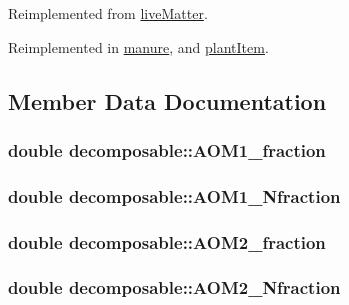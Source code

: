 Reimplemented from \hyperlink{classlive_matter_a694b548b571c88f71f2c7cc75b47d0fb}{liveMatter}.

Reimplemented in \hyperlink{classmanure_a88bca29dfcbb79bbe0a8a0ea33186fcc}{manure}, and \hyperlink{classplant_item_a57bdf6a52f37049686a779f3c93ecc73}{plantItem}.

\subsection{Member Data Documentation}
\hypertarget{classdecomposable_a273056446ce0c9b4d36d75f5d2cfd511}{
\subsubsection[{AOM1\_\-fraction}]{\setlength{\rightskip}{0pt plus 5cm}double {\bf decomposable::AOM1\_\-fraction}}}
\label{classdecomposable_a273056446ce0c9b4d36d75f5d2cfd511}
\hypertarget{classdecomposable_a3be10faa0acdfb1eba972eec222cdac9}{
\subsubsection[{AOM1\_\-Nfraction}]{\setlength{\rightskip}{0pt plus 5cm}double {\bf decomposable::AOM1\_\-Nfraction}}}
\label{classdecomposable_a3be10faa0acdfb1eba972eec222cdac9}
\hypertarget{classdecomposable_a22d9bf36c509a8cad1f0d7436f2a38f5}{
\subsubsection[{AOM2\_\-fraction}]{\setlength{\rightskip}{0pt plus 5cm}double {\bf decomposable::AOM2\_\-fraction}}}
\label{classdecomposable_a22d9bf36c509a8cad1f0d7436f2a38f5}
\hypertarget{classdecomposable_ae93cd4d9e67eedb64409c38bb8d4dbef}{
\subsubsection[{AOM2\_\-Nfraction}]{\setlength{\rightskip}{0pt plus 5cm}double {\bf decomposable::AOM2\_\-Nfraction}}}
